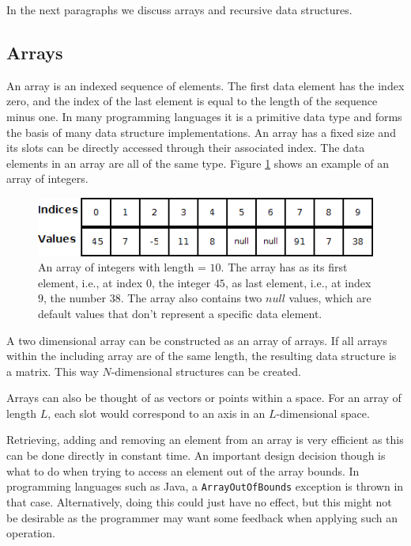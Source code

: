In the next paragraphs we discuss arrays and recursive data structures.


\subsection{Arrays}

An array is an indexed sequence of elements. The first data element has the index zero, and the index of the last element is equal to the length of the sequence minus one. In many programming languages it is a primitive data type and forms the basis of many data structure implementations. An array has a fixed size and its slots can be directly accessed through their associated index. The data elements in an array are all of the same type. Figure \ref{fig:array} shows an example of an array of integers.

\begin{figure}[H]
	\begin{center}
		\includegraphics[width=0.6\columnwidth]{img/programming-fundamentals/array}
		\caption{An array of integers with length = $10$. The array has as its first element, i.e., at index $0$, the integer $45$, as last element, i.e., at index $9$, the number $38$. The array also contains two $null$ values, which are default values that don't represent a specific data element.}
		\label{fig:array}
	\end{center}
\end{figure}

A two dimensional array can be constructed as an array of arrays. If all arrays within the including array are of the same length, the resulting data structure is a matrix. This way $N$-dimensional structures can be created.

Arrays can also be thought of as vectors or points within a space. For an array of length $L$, each slot would correspond to an axis in an $L$-dimensional space.

Retrieving, adding and removing an element from an array is very efficient as this can be done directly in constant time. An important design decision though is what to do when trying to access an element out of the array bounds. In programming languages such as Java, a \texttt{ArrayOutOfBounds} exception is thrown in that case. Alternatively, doing this could just have no effect, but this might not be desirable as the programmer may want some feedback when applying such an operation.

